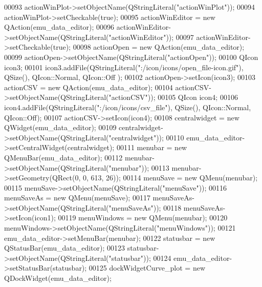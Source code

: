 \begin{DoxyCode}
00093         actionWinPlot->setObjectName(QStringLiteral(\textcolor{stringliteral}{"actionWinPlot"}));
00094         actionWinPlot->setCheckable(\textcolor{keyword}{true});
00095         actionWinEditor = \textcolor{keyword}{new} QAction(emu\_data\_editor);
00096         actionWinEditor->setObjectName(QStringLiteral(\textcolor{stringliteral}{"actionWinEditor"}));
00097         actionWinEditor->setCheckable(\textcolor{keyword}{true});
00098         actionOpen = \textcolor{keyword}{new} QAction(emu\_data\_editor);
00099         actionOpen->setObjectName(QStringLiteral(\textcolor{stringliteral}{"actionOpen"}));
00100         QIcon icon3;
00101         icon3.addFile(QStringLiteral(\textcolor{stringliteral}{":/icon/icons/open\_file-icon.gif"}), QSize(), QIcon::Normal, QIcon::Off
      );
00102         actionOpen->setIcon(icon3);
00103         actionCSV = \textcolor{keyword}{new} QAction(emu\_data\_editor);
00104         actionCSV->setObjectName(QStringLiteral(\textcolor{stringliteral}{"actionCSV"}));
00105         QIcon icon4;
00106         icon4.addFile(QStringLiteral(\textcolor{stringliteral}{":/icon/icons/csv\_file"}), QSize(), QIcon::Normal, QIcon::Off);
00107         actionCSV->setIcon(icon4);
00108         centralwidget = \textcolor{keyword}{new} QWidget(emu\_data\_editor);
00109         centralwidget->setObjectName(QStringLiteral(\textcolor{stringliteral}{"centralwidget"}));
00110         emu\_data\_editor->setCentralWidget(centralwidget);
00111         menubar = \textcolor{keyword}{new} QMenuBar(emu\_data\_editor);
00112         menubar->setObjectName(QStringLiteral(\textcolor{stringliteral}{"menubar"}));
00113         menubar->setGeometry(QRect(0, 0, 613, 26));
00114         menuSave = \textcolor{keyword}{new} QMenu(menubar);
00115         menuSave->setObjectName(QStringLiteral(\textcolor{stringliteral}{"menuSave"}));
00116         menuSaveAs = \textcolor{keyword}{new} QMenu(menuSave);
00117         menuSaveAs->setObjectName(QStringLiteral(\textcolor{stringliteral}{"menuSaveAs"}));
00118         menuSaveAs->setIcon(icon1);
00119         menuWindows = \textcolor{keyword}{new} QMenu(menubar);
00120         menuWindows->setObjectName(QStringLiteral(\textcolor{stringliteral}{"menuWindows"}));
00121         emu\_data\_editor->setMenuBar(menubar);
00122         statusbar = \textcolor{keyword}{new} QStatusBar(emu\_data\_editor);
00123         statusbar->setObjectName(QStringLiteral(\textcolor{stringliteral}{"statusbar"}));
00124         emu\_data\_editor->setStatusBar(statusbar);
00125         dockWidgetCurve\_plot = \textcolor{keyword}{new} QDockWidget(emu\_data\_editor);

\end{DoxyCode}
